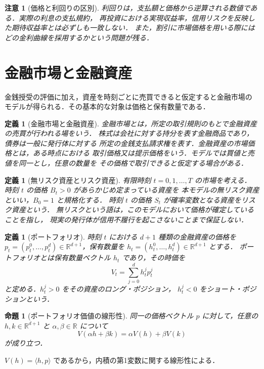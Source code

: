 \documentclass[a5paper,10pt,onecolumn]{jsarticle}
\makeatletter
\theoremstyle{mathnotetheorem}
\newtheorem{definition}[theorem]{定義}
\newtheorem{proposition}[theorem]{命題}
\newtheorem{remark}[theorem]{注意}
\renewcommand{\proofname}{証明}
\renewenvironment{proof}[1][\proofname]{%
  \par\pushQED{\qed}\normalfont\topsep4\p@\@plus2\p@\relax
  \trivlist\item[\hskip\labelsep\bfseries #1]\ignorespaces
}{\popQED\endtrivlist\@endpefalse}
\newcommand{\R}{\mathbb{R}}
\makeatother
\begin{document}
\begin{remark}[価格と利回りの区別]
利回りは，支払額と価格から逆算される数値である．実際の利息の支払規約，
再投資における実現収益率，信用リスクを反映した期待収益率とは必ずしも一致しない．
また，割引に市場価格を用いる際にはどの金利曲線を採用するかという問題が残る．
\end{remark}

\section{金融市場と金融資産}

金銭授受の評価に加え，資産を時刻ごとに売買できると仮定すると金融市場の
モデルが得られる．その基本的な対象は価格と保有数量である．

\begin{definition}[金融市場と金融資産]
\emph{金融市場}とは，所定の取引規則のもとで金融資産の売買が行われる場をいう．
株式は会社に対する持分を表す金融商品であり，債券は一般に発行体に対する
所定の金銭支払請求権を表す．金融資産の\emph{市場価格}とは，ある時点における
取引価格又は提示価格をいう．モデルでは買値と売値を同一とし，任意の数量を
その価格で取引できると仮定する場合がある．
\end{definition}

\begin{definition}[無リスク資産とリスク資産]
有限時刻 $t=0,1,\ldots,T$ の市場を考える．
時刻 $t$ の価格 $B_t>0$ があらかじめ定まっている資産を
本モデルの\emph{無リスク資産}といい，$B_0=1$ と規格化する．
時刻 $t$ の価格 $S_t$ が確率変数となる資産を\emph{リスク資産}という．
無リスクという語は，このモデルにおいて価格が確定していることを指し，
現実の発行体が信用不履行を起こさないことまで保証しない．
\end{definition}

\begin{definition}[ポートフォリオ]
時刻 $t$ における $d+1$ 種類の金融資産の価格を
$p_t=(p_t^0,\ldots,p_t^d)\in\R^{d+1}$，保有数量を
$h_t=(h_t^0,\ldots,h_t^d)\in\R^{d+1}$ とする．
\emph{ポートフォリオ}とは保有数量ベクトル $h_t$ であり，その時価を
\[
 V_t=\sum_{j=0}^d h_t^jp_t^j
\]
と定める．$h_t^j>0$ をその資産の\emph{ロング・ポジション}，
$h_t^j<0$ を\emph{ショート・ポジション}という．
\end{definition}

\begin{proposition}[ポートフォリオ価値の線形性]
同一の価格ベクトル $p$ に対して，任意の $h,k\in\R^{d+1}$ と
$\alpha,\beta\in\R$ について
\[
 V(\alpha h+\beta k)=\alpha V(h)+\beta V(k)
\]
が成り立つ．
\end{proposition}
\begin{proof}
$V(h)=\langle h,p\rangle$ であるから，内積の第1変数に関する線形性による．
\end{proof}
\end{document}
